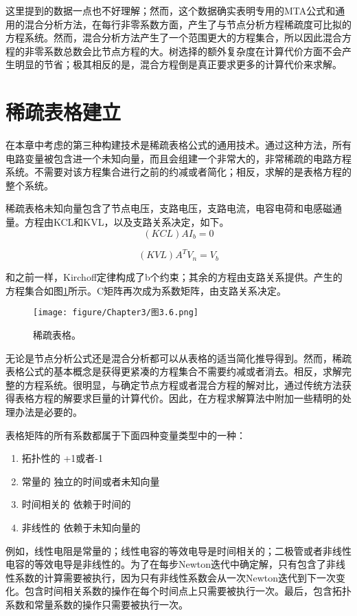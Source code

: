 这里提到的数据一点也不好理解；然而，这个数据确实表明专用的MTA公式和通用的混合分析方法，在每行非零系数方面，产生了与节点分析方程稀疏度可比拟的方程系统。然而，混合分析方法产生了一个范围更大的方程集合，所以因此混合方程的非零系数总数会比节点方程的大。树选择的额外复杂度在计算代价方面不会产生明显的节省；极其相反的是，混合方程倒是真正要求更多的计算代价来求解。

\section{稀疏表格建立}
在本章中考虑的第三种构建技术是稀疏表格公式的通用技术\cite{ref-48}。通过这种方法，所有电路变量被包含进一个未知向量，而且会组建一个非常大的，非常稀疏的电路方程系统。不需要对该方程集合进行之前的约减或者简化；相反，求解的是表格方程的整个系统。

稀疏表格未知向量包含了节点电压，支路电压，支路电流，电容电荷和电感磁通量。方程由KCL和KVL，以及支路关系决定，如下。
\begin{equation}
    (KCL) AI_b = 0
    \label{eq:3.35}
\end{equation}

\begin{equation}
    (KVL) A^TV_n = V_b
    \label{eq:3.36}
\end{equation}

和之前一样，Kirchoff定律构成了b个约束；其余的方程由支路关系提供。产生的方程集合如图\ref{图3.6}所示。C矩阵再次成为系数矩阵，由支路关系决定。
\begin{figure}[htbp]
\small
    \centering
    \texttt{[image: figure/Chapter3/图3.6.png]}
    \caption{稀疏表格。}
    \label{图3.6}
\end{figure}

无论是节点分析公式还是混合分析都可以从表格的适当简化推导得到\cite{ref-46}。然而，稀疏表格公式的基本概念是获得更紧凑的方程集合不需要约减或者消去。相反，求解完整的方程系统。很明显，与确定节点方程或者混合方程的解对比，通过传统方法获得表格方程的解要求巨量的计算代价。因此，在方程求解算法中附加一些精明的处理办法是必要的。

表格矩阵的所有系数都属于下面四种变量类型中的一种：
\begin{enumerate}
    \item 拓扑性的 +1或者-1
    \item 常量的 独立的时间或者未知向量
    \item 时间相关的 依赖于时间的
    \item 非线性的 依赖于未知向量的
\end{enumerate}
例如，线性电阻是常量的；线性电容的等效电导是时间相关的；二极管或者非线性电容的等效电导是非线性的。为了在每步Newton迭代中确定解，只有包含了非线性系数的计算需要被执行，因为只有非线性系数会从一次Newton迭代到下一次变化。包含时间相关系数的操作在每个时间点上只需要被执行一次。最后，包含拓扑系数和常量系数的操作只需要被执行一次。

